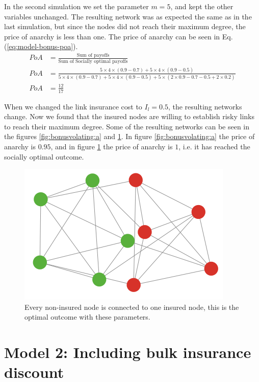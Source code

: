 In the second simulation we set the parameter $m=5$, and kept the other variables unchanged. The resulting network was as expected the same as in the last simulation, but since the nodes did not reach their maximum degree, the price of anarchy is less than one. The price of anarchy can be seen in Eq.(\ref{eq:model-bonus-poa}).
\begin{eqnarray}
PoA&=\frac{\text{Sum of payoffs}}{\text{Sum of Socially optimal payoffs}}  \nonumber \\
PoA&=\frac{5\times 4\times (0.9-0.7)+5\times 4\times(0.9-0.5)}{5\times 4\times (0.9-0.7)+5\times 4\times(0.9-0.5)+5\times (2\times 0.9-0.7-0.5 + 2 \times 0.2)}\nonumber \\
PoA&=\frac{12}{17}
\label{eq:model-bonus-poa}
\end{eqnarray}

When we changed the link insurance cost to $I_{l}=0.5$, the resulting networks change. Now we found that the insured nodes are willing to establish risky links to reach their maximum degree. Some of the resulting networks can be seen in the figures \ref{fig:bonusvolating:a} and \ref{fig:bonusvolating:b}. In figure \ref{fig:bonusvolating:a} the price of anarchy is $0.95$, and in figure \ref{fig:bonusvolating:b} the price of anarchy is $1$, i.e. it has reached the socially optimal outcome.


\begin{figure}
  \centering
  \includegraphics[scale=0.5]{../Figures/BonusGameViolatingOptimal.png}
  \caption{\label{fig:bonusvolating:b}Every non-insured node is connected to one insured node, this is the optimal outcome with these parameters.}
\end{figure}
  
\section{Model 2: Including bulk insurance discount}

